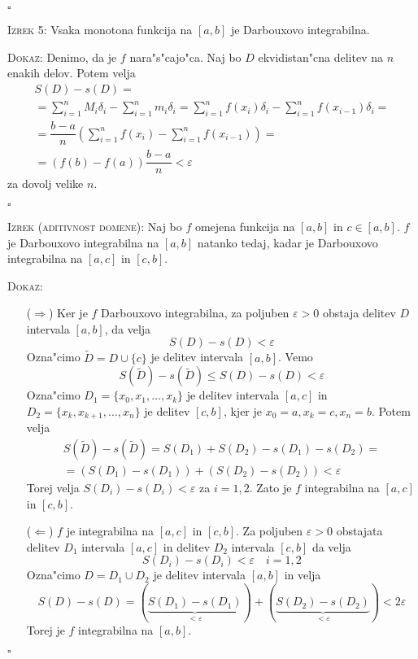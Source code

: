 \hfill $\square$

\textsc{Izrek 5:} Vsaka monotona funkcija na $[a, b]$ je Darbouxovo integrabilna.

\textsc{Dokaz:} Denimo, da je $f$ nara"s"cajo"ca. Naj bo $D$ ekvidistan"cna delitev na $n$ enakih delov. Potem velja
\begin{multline*}
S(D) - s(D) = \\
= \sum_{i = 1}^{n} M_i \delta_i - \sum_{i= 1}^{n} m_i \delta_i = \sum_{i = 1}^{n}f(x_i) \delta_i - \sum_{i = 1}^{n}f(x_{i-1}) \delta_i = \\
= \dfrac{b-a}{n} \left( \sum_{i = 1}^{n} f(x_i) - \sum_{i = 1}^{n} f(x_{i-1}) \right) = \\
= (f(b) - f(a)) \dfrac{b-a}{n} < \varepsilon
\end{multline*}
za dovolj velike $n$.

\hfill $\square$

\textsc{Izrek (aditivnost domene):} Naj bo $f$ omejena funkcija na $[a, b]$ in $c \in [a, b]$. $f$ je Darbouxovo integrabilna na $[a, b]$ natanko tedaj, kadar je Darbouxovo integrabilna na $[a, c]$ in $[c, b]$.

\textsc{Dokaz:}
\begin{itemize}
	\item[($\Rightarrow$)] Ker je $f$ Darbouxovo integrabilna, za poljuben $\varepsilon > 0$ obstaja delitev $D$ intervala $[a, b]$, da velja
	\begin{equation*}
	S(D) - s(D) < \varepsilon
	\end{equation*}
	Ozna"cimo $\widetilde{D} = D \cup \{c\}$ je delitev intervala $[a, b]$. Vemo
	\begin{equation*}
	S(\widetilde{D}) - s(\widetilde{D}) \leq S(D) - s(D) < \varepsilon
	\end{equation*} 
	Ozna"cimo $D_1 = \{x_0, x_1, \ldots, x_k\}$ je delitev intervala $[a, c]$ in $D_2 = \{x_k, x_{k+1}, \ldots, x_n\}$ je delitev $[c, b]$, kjer je $x_0 = a, x_k = c, x_n = b$. Potem velja
	\begin{gather*}
	S(\widetilde{D}) - s(\widetilde{D}) = S(D_1) + S(D_2) - s(D_1) - s(D_2) = \\
	=(S(D_1) - s(D_1)) + (S(D_2) - s(D_2)) < \varepsilon
	\end{gather*}
	Torej velja $S(D_i) - s(D_i) < \varepsilon$ za $i = 1, 2$. Zato je $f$ integrabilna na $[a, c]$ in $[c, b]$.
	
	\item[($\Leftarrow$)] $f$ je integrabilna na $[a, c]$ in $[c, b]$. Za poljuben $\varepsilon > 0$ obstajata delitev $D_1$ intervala $[a, c]$ in delitev $D_2$ intervala $[c, b]$ da velja
	\begin{equation*}
	S(D_i) - s(D_i) < \varepsilon \quad i = 1, 2
	\end{equation*}
	Ozna"cimo $D = D_1 \cup D_2$ je delitev intervala $[a, b]$ in velja
	\begin{equation*}
	S(D) - s(D) = (\underbrace{S(D_1) - s(D_1)}_{< \varepsilon}) + (\underbrace{S(D_2) - s(D_2)}_{< \varepsilon}) < 2\varepsilon
	\end{equation*}
	Torej je $f$ integrabilna na $[a, b]$.
\end{itemize}
\hfill $\square$

